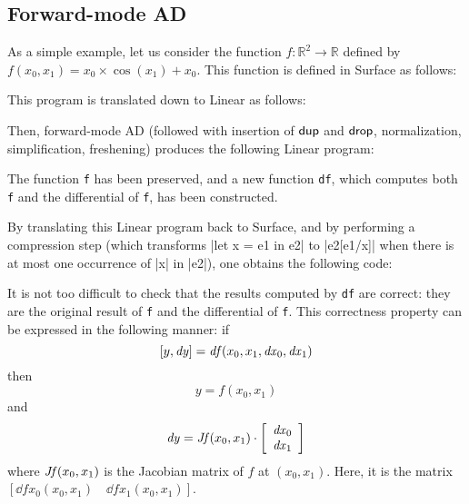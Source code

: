 \documentclass{article}
\begin{document}
\subsection{Forward-mode AD}
\label{sec:example:fmad}

As a simple example, let us consider the function $f : \mathbb{R}^2 \rightarrow
\mathbb{R}$ defined by $f(x_0, x_1) = x_0\times\cos(x_1)+x_0$.
%
This function is defined in Surface as follows:

\lstset{rangeprefix=(*\ ,rangesuffix=\ *),includerangemarker=false}
\begin{mdframed}[backgroundcolor=gray!10,linewidth=0pt]

\end{mdframed}

This program is translated down to Linear as follows:

\begin{mdframed}[backgroundcolor=gray!10,linewidth=0pt]

\end{mdframed}

Then, forward-mode AD (followed with insertion of $\mathsf{dup}$ and
$\mathsf{drop}$, normalization, simplification, freshening) produces the
following Linear program:

\begin{mdframed}[backgroundcolor=gray!10,linewidth=0pt]

\end{mdframed}

The function \texttt{f} has been preserved, and a new function \texttt{df},
which computes both \texttt{f} and the differential of \texttt{f}, has been
constructed.

By translating this Linear program back to Surface,
and by performing a compression step
(which transforms \oc|let x = e1 in e2| to \oc|e2[e1/x]|
 when there is at most one occurrence of \oc|x| in \oc|e2|),
one obtains the following code:

\begin{mdframed}[backgroundcolor=gray!10,linewidth=0pt]

\end{mdframed}

It is not too difficult to check that the results computed by \texttt{df} are
correct: they are the original result of \texttt{f} and the differential of
\texttt{f}. This correctness property can be expressed in the following manner:
%
if \[[y, \mathit{dy}] = \mathit{df}(x_0, x_1, \mathit{dx}_0, \mathit{dx}_1)\]
then \[y=f(x_0, x_1)\]
and \[\mathit{dy}=\mathit{Jf}(x_0,x_1) \cdot \left[\begin{array}{c}\mathit{dx}_0\\\mathit{dx}_1\end{array}\right]\]
where
$\mathit{Jf}(x_0, x_1)$ is the Jacobian matrix of $f$ at $(x_0, x_1)$.
Here, it is the matrix $[ \dd{f}{x_0}(x_0, x_1) \quad \dd{f}{x_1}(x_0, x_1) ]$.
\end{document}
